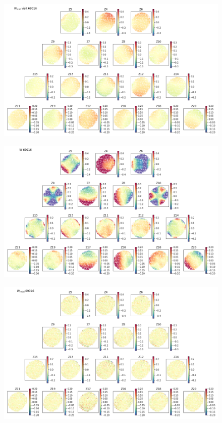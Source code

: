 \documentclass{article}
\begin{document}
\begin{figure}
    \includegraphics{Wvisit69016.png}

    \caption{}

    \label{fig:Wvisit69016}
\end{figure}

\begin{figure}
    \includegraphics{W69016.png}

    \caption{}

    \label{fig:W69016}
\end{figure}

\begin{figure}
    \includegraphics{Wresid69016.png}

    \caption{}

    \label{fig:Wresid69016}
\end{figure}
\end{document}
